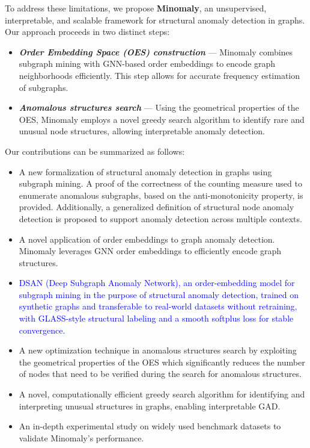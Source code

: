 \documentclass[preprint,12pt]{elsarticle}
\newcommand{\new}[1]{\textcolor{blue}{#1}}
\theoremstyle{plain}
\theoremstyle{definition}
\theoremstyle{remark}
\begin{document}
To address these limitations, we propose \textbf{Minomaly}, an unsupervised, interpretable, and scalable framework for structural anomaly detection in graphs. Our approach proceeds in two distinct steps:
\begin{itemize}
    \item \textbf{\textit{Order Embedding Space (OES) construction}}  --- Minomaly combines subgraph mining with GNN-based order embeddings to encode graph neighborhoods efficiently. This step allows for accurate frequency estimation of subgraphs.
    \item \textbf{\textit{Anomalous structures search}}  --- Using the geometrical properties of the OES, Minomaly employs a novel greedy search algorithm to identify rare and unusual node structures, allowing interpretable anomaly detection.
\end{itemize}
Our contributions can be summarized as follows:
\begin{itemize}
    \item A new formalization of structural anomaly detection in graphs using subgraph mining. A proof of the correctness of the counting measure used to enumerate anomalous subgraphs, based on the anti-monotonicity property, is provided. Additionally, a generalized definition of structural node anomaly detection is proposed to support anomaly detection across multiple contexts.
    \item A novel application of order embeddings to graph anomaly detection. Minomaly leverages GNN order embeddings to efficiently encode graph structures.
    \item \new{DSAN (Deep Subgraph Anomaly Network), an order-embedding model for subgraph mining in the purpose of structural anomaly detection, trained on synthetic graphs and transferable to real-world datasets without retraining, with GLASS-style structural labeling and a smooth softplus loss for stable convergence.}
    \item A new optimization technique in anomalous structures search by exploiting the geometrical properties of the OES which significantly reduces the number of nodes that need to be verified during the search for anomalous structures.
    \item A novel, computationally efficient greedy search algorithm for identifying and interpreting unusual structures in graphs, enabling interpretable GAD.
    \item An in-depth experimental study on widely used benchmark datasets to validate Minomaly's performance.
\end{itemize}
\end{document}
